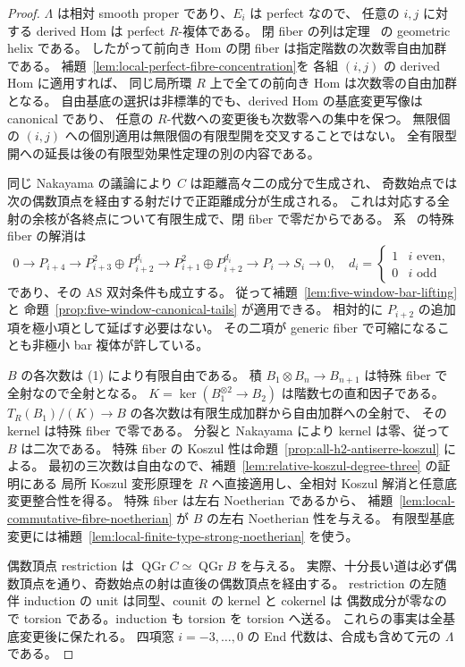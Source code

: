 \begin{proof}
$\Lambda$ は相対 smooth proper であり、$E_i$ は perfect なので、
任意の $i,j$ に対する derived Hom は perfect $R$-複体である。
閉 fiber の列は定理~\cite[\texttt{thm:normal-helix}]{QuadricIntrinsic2026} の geometric helix である。
したがって前向き Hom の閉 fiber は指定階数の次数零自由加群である。
補題~\ref{lem:local-perfect-fibre-concentration}を
各組 $(i,j)$ の derived Hom に適用すれば、
同じ局所環 $R$ 上で全ての前向き Hom は次数零の自由加群となる。
自由基底の選択は非標準的でも、derived Hom の基底変更写像は canonical であり、
任意の $R$-代数への変更後も次数零への集中を保つ。
無限個の $(i,j)$ への個別適用は無限個の有限型開を交叉することではない。
全有限型開への延長は後の有限型効果性定理の別の内容である。

同じ Nakayama の議論により $C$ は距離高々二の成分で生成され、
奇数始点では次の偶数頂点を経由する射だけで正距離成分が生成される。
これは対応する全射の余核が各終点について有限生成で、閉 fiber で零だからである。
系~\cite[\texttt{cor:normal-cubic-defect}]{QuadricIntrinsic2026} の特殊 fiber の解消は
\[
 0\to P_{i+4}\to P_{i+3}^{2}\oplus P_{i+2}^{d_i}
 \to P_{i+1}^{2}\oplus P_{i+2}^{d_i}\to P_i\to S_i\to0,
 \quad d_i=\begin{cases}1&i\text{ even},\\0&i\text{ odd}\end{cases}
\]
であり、その AS 双対条件も成立する。
従って補題~\ref{lem:five-window-bar-lifting} と
命題~\ref{prop:five-window-canonical-tails} が適用できる。
相対的に $P_{i+2}$ の追加項を極小項として延ばす必要はない。
その二項が generic fiber で可縮になることも非極小 bar 複体が許している。

$B$ の各次数は (1) により有限自由である。
積 $B_1\otimes B_n\to B_{n+1}$ は特殊 fiber で全射なので全射となる。
$K=\ker(B_1^{\otimes2}\to B_2)$ は階数七の直和因子である。
$T_R(B_1)/(K)\to B$ の各次数は有限生成加群から自由加群への全射で、
その kernel は特殊 fiber で零である。
分裂と Nakayama により kernel は零、従って $B$ は二次である。
特殊 fiber の Koszul 性は命題~\ref{prop:all-h2-antiserre-koszul} による。
最初の三次数は自由なので、補題~\ref{lem:relative-koszul-degree-three} の証明にある
局所 Koszul 変形原理を $R$ へ直接適用し、全相対 Koszul 解消と任意底変更整合性を得る。
特殊 fiber は左右 Noetherian であるから、
補題~\ref{lem:local-commutative-fibre-noetherian} が $B$ の左右 Noetherian 性を与える。
有限型基底変更には補題~\ref{lem:local-finite-type-strong-noetherian} を使う。

偶数頂点 restriction は $\operatorname{QGr}C\simeq\operatorname{QGr}B$ を与える。
実際、十分長い道は必ず偶数頂点を通り、奇数始点の射は直後の偶数頂点を経由する。
restriction の左随伴 induction の unit は同型、counit の kernel と cokernel は
偶数成分が零なので torsion である。induction も torsion を torsion へ送る。
これらの事実は全基底変更後に保たれる。
四項窓 $i=-3,\ldots,0$ の End 代数は、合成も含めて元の $\Lambda$ である。


\end{proof}
